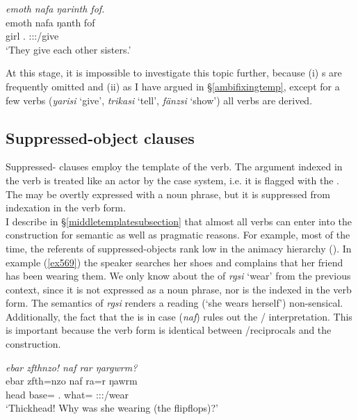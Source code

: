 \begin{exe}
 	\ex \emph{emoth nafa ŋarinth fof.}\\
 	\gll emoth nafa ŋanth fof\\
 	girl \Tnsg.\Erg{} \Stdu:\Sbj:\Nonpast:\Ipfv/give \Emph{}\\
 	\trans `They give each other sisters.'
 	\label{ex568}
\end{exe}

At this stage, it is impossible to investigate this topic further, because (i) s are frequently omitted and (ii) as I have argued in \S{}\ref{ambifixingtemp}, except for a few verbs (\emph{yarisi} `give', \emph{trikasi} `tell', \emph{fänzsi} `show') all  verbs are derived.

\subsection{Suppressed-object clauses}\label{suppressedobjectclause}

Suppressed- clauses employ the  template of the verb. The argument indexed in the verb is treated like an actor by the case system, i.e. it is flagged with the  . The  may be overtly expressed with a noun phrase, but it is suppressed from indexation in the verb form.\\

I describe in \S{}\ref{middletemplatesubsection} that almost all  verbs can enter into the  construction for semantic as well as pragmatic reasons. For example, most of the time, the referents of suppressed-objects rank low in the animacy hierarchy (\citealt{Silverstein:1976vo}). In example (\ref{ex569}) the speaker searches her shoes and complains that her friend has been wearing them. We only know about the  of \emph{rgsi} `wear' from the previous context, since it is not expressed as a noun phrase, nor is the  indexed in the verb form. The semantics of \emph{rgsi} renders a  reading (`she wears herself') non-sensical. Additionally, the fact that the  is in  case (\emph{naf}) rules out the / interpretation. This is important because the verb form is identical between /reciprocals and the  construction.

\begin{exe}
	\ex \emph{ebar zfthnzo! naf rar ŋargwrm?}\\
	\gll ebar zfth=nzo naf ra=r ŋawrm\\
	head base=\Only{} \Tsg.\Erg{} what=\Purp{} \Sg:\Sbj:\Rpst:\Dur/wear\\
	\trans `Thickhead! Why was she wearing (the flipflops)?'
	\label{ex569}
\end{exe}

